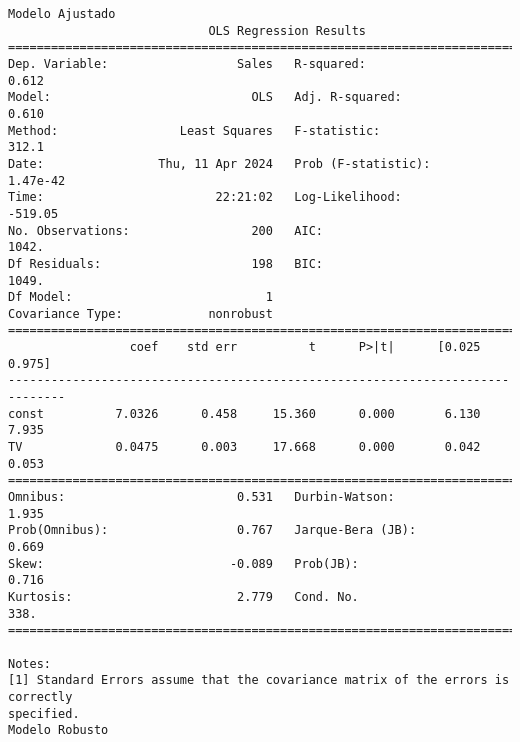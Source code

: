 \documentclass[11pt]{article}
\newcommand{\prompt}[4]{
        {\ttfamily\llap{{\color{#2}[#3]:\hspace{3pt}#4}}\vspace{-\baselineskip}}
    }
\begin{document}
    \begin{Verbatim}[commandchars=\\\{\}]
Modelo Ajustado
                            OLS Regression Results
==============================================================================
Dep. Variable:                  Sales   R-squared:                       0.612
Model:                            OLS   Adj. R-squared:                  0.610
Method:                 Least Squares   F-statistic:                     312.1
Date:                Thu, 11 Apr 2024   Prob (F-statistic):           1.47e-42
Time:                        22:21:02   Log-Likelihood:                -519.05
No. Observations:                 200   AIC:                             1042.
Df Residuals:                     198   BIC:                             1049.
Df Model:                           1
Covariance Type:            nonrobust
==============================================================================
                 coef    std err          t      P>|t|      [0.025      0.975]
------------------------------------------------------------------------------
const          7.0326      0.458     15.360      0.000       6.130       7.935
TV             0.0475      0.003     17.668      0.000       0.042       0.053
==============================================================================
Omnibus:                        0.531   Durbin-Watson:                   1.935
Prob(Omnibus):                  0.767   Jarque-Bera (JB):                0.669
Skew:                          -0.089   Prob(JB):                        0.716
Kurtosis:                       2.779   Cond. No.                         338.
==============================================================================

Notes:
[1] Standard Errors assume that the covariance matrix of the errors is correctly
specified.
Modelo Robusto
    \end{Verbatim}
 
            
\prompt{Out}{outcolor}{26}{}
    
\end{document}
